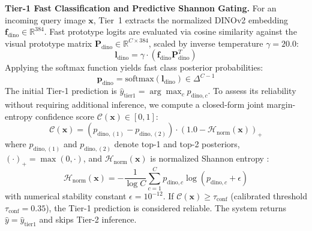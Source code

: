 \documentclass[conference]{IEEEtran}
\begin{document}
\medskip
\textbf{Tier-1 Fast Classification and Predictive Shannon Gating.} For an incoming query image $\mathbf{x}$, Tier~1 extracts the normalized DINOv2 embedding $\mathbf{f}_{\text{dino}} \in \mathbb{R}^{384}$. Fast prototype logits are evaluated via cosine similarity against the visual prototype matrix $\mathbf{P}_{\text{dino}} \in \mathbb{R}^{C \times 384}$, scaled by inverse temperature $\gamma = 20.0$:
\begin{equation}
    \label{eq:tier1_logits}
    \mathbf{l}_{\text{dino}} = \gamma \cdot \left(\mathbf{f}_{\text{dino}} \mathbf{P}_{\text{dino}}^T\right)
\end{equation}
Applying the softmax function yields fast class posterior probabilities:
\begin{equation}
    \label{eq:tier1_softmax}
    \mathbf{p}_{\text{dino}} = \text{softmax}(\mathbf{l}_{\text{dino}}) \in \Delta^{C-1}
\end{equation}
The initial Tier-1 prediction is $\hat{y}_{\text{tier1}} = \arg\max_c p_{\text{dino}, c}$. To assess its reliability without requiring additional inference, we compute a closed-form joint margin-entropy confidence score $\mathcal{C}(\mathbf{x}) \in [0, 1]$:
\begin{equation}
    \label{eq:shannon_gate}
    \mathcal{C}(\mathbf{x}) = \left(p_{\text{dino}, (1)} - p_{\text{dino}, (2)}\right) \cdot \left(1.0 - \mathcal{H}_{\text{norm}}(\mathbf{x})\right)_+
\end{equation}
where $p_{\text{dino}, (1)}$ and $p_{\text{dino}, (2)}$ denote top-1 and top-2 posteriors, $(\cdot)_+ = \max(0, \cdot)$, and $\mathcal{H}_{\text{norm}}(\mathbf{x})$ is normalized Shannon entropy \cite{shannon1948mathematical}:
\begin{equation}
    \mathcal{H}_{\text{norm}}(\mathbf{x}) = -\frac{1}{\log C} \sum_{c=1}^C p_{\text{dino}, c} \log(p_{\text{dino}, c} + \epsilon)
\end{equation}
with numerical stability constant $\epsilon = 10^{-12}$. If $\mathcal{C}(\mathbf{x}) \ge \tau_{\text{conf}}$ (calibrated threshold $\tau_{\text{conf}} = 0.35$), the Tier-1 prediction is considered reliable. The system returns $\hat{y} = \hat{y}_{\text{tier1}}$ and skips Tier-2 inference.
\end{document}
